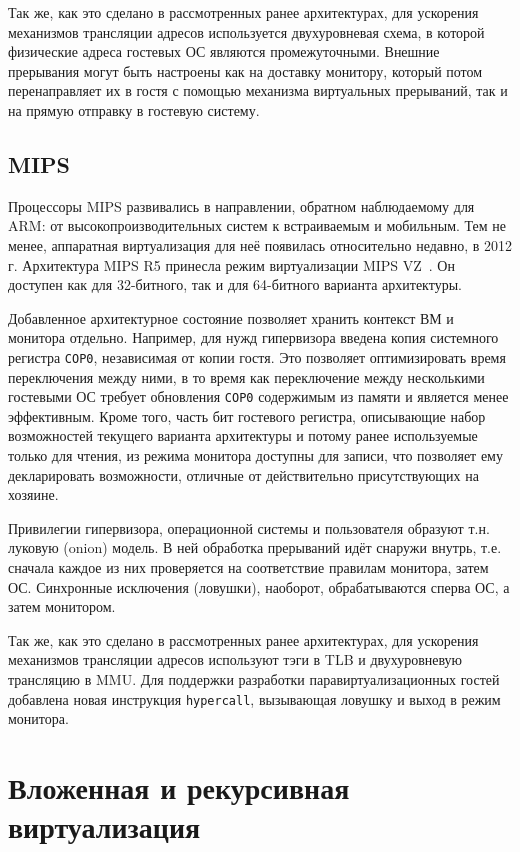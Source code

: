 Так же, как это сделано в рассмотренных ранее архитектурах, для ускорения механизмов трансляции адресов используется двухуровневая схема, в которой физические адреса гостевых ОС являются промежуточными. Внешние прерывания могут быть настроены как на доставку монитору, который потом перенаправляет их в гостя с помощью механизма виртуальных прерываний, так и на прямую отправку в гостевую систему.

\subsection{MIPS}

Процессоры MIPS развивались в направлении, обратном наблюдаемому для ARM: от высокопроизводительных систем к встраиваемым и мобильным. Тем не менее, аппаратная виртуализация для неё появилась относительно недавно, в 2012 г. Архитектура MIPS R5 принесла режим виртуализации MIPS VZ~\cite{mips-vz}. Он доступен как для 32-битного, так и для 64-битного варианта архитектуры.

Добавленное архитектурное состояние позволяет хранить контекст ВМ и монитора отдельно. Например, для нужд гипервизора введена копия системного регистра \texttt{COP0}, независимая от копии гостя. Это позволяет оптимизировать время переключения между ними, в то время как переключение между несколькими гостевыми ОС требует обновления \texttt{COP0} содержимым из памяти и является менее эффективным. Кроме того, часть бит гостевого регистра, описывающие набор возможностей текущего варианта архитектуры и потому ранее используемые только для чтения, из режима монитора доступны для записи, что позволяет ему декларировать возможности, отличные от действительно присутствующих на хозяине.

Привилегии гипервизора, операционной системы и пользователя образуют т.н. луковую (\abbr onion) модель. В ней обработка прерываний идёт снаружи внутрь, т.е. сначала каждое из них проверяется на соответствие правилам монитора, затем ОС. Синхронные исключения (ловушки), наоборот, обрабатываются сперва ОС, а затем монитором.

Так же, как это сделано в рассмотренных ранее архитектурах, для ускорения механизмов трансляции адресов используют тэги в TLB и двухуровневую трансляцию в MMU. Для поддержки разработки паравиртуализационных гостей добавлена новая инструкция \texttt{hypercall}, вызывающая ловушку и выход в режим монитора.

\section{Вложенная и рекурсивная виртуализация}

